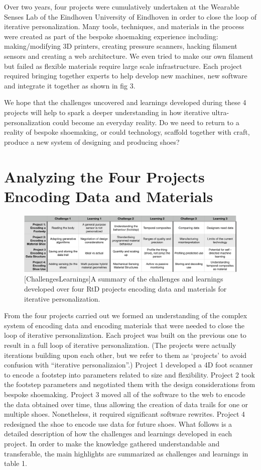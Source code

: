 Over two years, four projects were cumulatively undertaken at the Wearable Senses Lab of the Eindhoven University of Eindhoven in order to close the loop of iterative personalization. Many tools, techniques, and materials in the process were created as part of the bespoke shoemaking experience including: making/modifying 3D printers, creating pressure scanners, hacking filament sensors and creating a web architecture. We even tried to make our own filament but failed as flexible materials require large scale infrastructure. Each project required bringing together experts to help develop new machines, new software and integrate it together as shown in fig 3.

We hope that the challenges uncovered and learnings developed during these 4 projects will help to spark a deeper understanding in how iterative ultra-personalization could become an everyday reality. Do we need to return to a reality of bespoke shoemaking, or could technology, scaffold together with craft, produce a new system of designing and producing shoes?

\section{Analyzing the Four Projects Encoding Data and Materials}

\begin{figure}
\includegraphics[width=.999\textwidth]{Table}
[ChallengesLearnings]{A summary of the challenges and learnings developed over four RtD projects encoding data and materials for iterative personalization.}
\label{fig:ChallengesLearnings}
\end{figure}

From the four projects carried out we formed an understanding of the complex system of encoding data and encoding materials that were needed to close the loop of iterative personalization.  Each project was built on the previous one to result in a full loop of iterative personalization. (The projects were actually iterations building upon each other, but we refer to them as `projects' to avoid confusion with ``iterative personalizaion''.)  Project 1 developed a 4D foot scanner to encode a footstep into parameters related to size and flexibility. Project 2 took the footstep parameters and negotiated them with the design considerations from bespoke shoemaking. Project 3 moved all of the software to the web to encode the data obtained over time, thus allowing the creation of data trails for one or multiple shoes. Nonetheless, it required significant software rewrites. Project 4 redesigned the shoe to encode use data for future shoes. What follows is a detailed description of how the challenges and learnings developed in each project. In order to make the knowledge gathered understandable and transferable, the main highlights are summarized as challenges and learnings in table 1.

